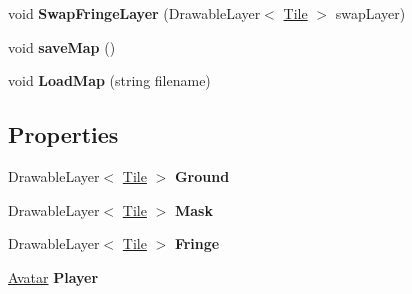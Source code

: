 \begin{DoxyCompactItemize}
\item 
\hypertarget{class_tile_engine_1_1_map_a7387df79a406ca23119ce40c2fa6f1d9}{void {\bfseries Swap\-Fringe\-Layer} (Drawable\-Layer$<$ \hyperlink{class_tile_engine_1_1_tile}{Tile} $>$ swap\-Layer)}\label{d9/da2/class_tile_engine_1_1_map_a7387df79a406ca23119ce40c2fa6f1d9}

\item 
\hypertarget{class_tile_engine_1_1_map_afee605561b80396694c1acbaae6d219d}{void {\bfseries save\-Map} ()}\label{d9/da2/class_tile_engine_1_1_map_afee605561b80396694c1acbaae6d219d}

\item 
\hypertarget{class_tile_engine_1_1_map_a1ee45c38c5f3b51cdc59b5deb05a5bc2}{void {\bfseries Load\-Map} (string filename)}\label{d9/da2/class_tile_engine_1_1_map_a1ee45c38c5f3b51cdc59b5deb05a5bc2}

\end{DoxyCompactItemize}
\subsection*{Properties}
\begin{DoxyCompactItemize}
\item 
\hypertarget{class_tile_engine_1_1_map_a93d6a67a5388e1ad95245cb459847270}{Drawable\-Layer$<$ \hyperlink{class_tile_engine_1_1_tile}{Tile} $>$ {\bfseries Ground}}\label{d9/da2/class_tile_engine_1_1_map_a93d6a67a5388e1ad95245cb459847270}

\item 
\hypertarget{class_tile_engine_1_1_map_a298d145d16f3dc824a0c0875434ffa0b}{Drawable\-Layer$<$ \hyperlink{class_tile_engine_1_1_tile}{Tile} $>$ {\bfseries Mask}}\label{d9/da2/class_tile_engine_1_1_map_a298d145d16f3dc824a0c0875434ffa0b}

\item 
\hypertarget{class_tile_engine_1_1_map_abe95706f37041feb1285be80522abbb3}{Drawable\-Layer$<$ \hyperlink{class_tile_engine_1_1_tile}{Tile} $>$ {\bfseries Fringe}}\label{d9/da2/class_tile_engine_1_1_map_abe95706f37041feb1285be80522abbb3}

\item 
\hypertarget{class_tile_engine_1_1_map_a8cc2e7e3754056565eb5cb9250d62ceb}{\hyperlink{class_tile_engine_1_1_avatar}{Avatar} {\bfseries Player}}\label{d9/da2/class_tile_engine_1_1_map_a8cc2e7e3754056565eb5cb9250d62ceb}

\end{DoxyCompactItemize}


